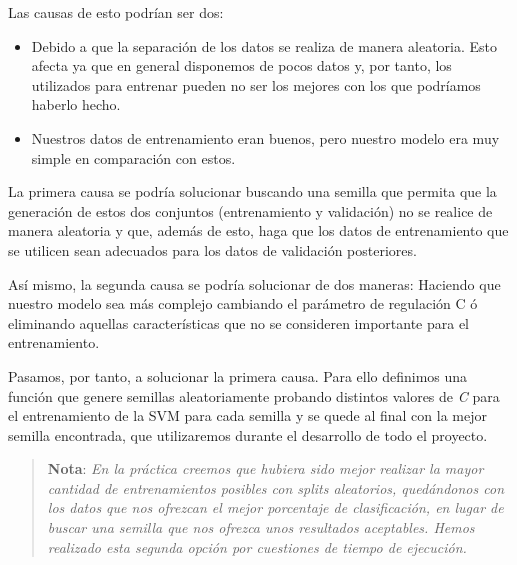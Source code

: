 \documentclass[11pt]{article}
\begin{document}
Las causas de esto podrían ser dos:

\begin{itemize}
\item
  Debido a que la separación de los datos se realiza de manera
  aleatoria. Esto afecta ya que en general disponemos de pocos datos y,
  por tanto, los utilizados para entrenar pueden no ser los mejores con
  los que podríamos haberlo hecho.
\item
  Nuestros datos de entrenamiento eran buenos, pero nuestro modelo era
  muy simple en comparación con estos.
\end{itemize}

La primera causa se podría solucionar buscando una semilla que permita
que la generación de estos dos conjuntos (entrenamiento y validación) no
se realice de manera aleatoria y que, además de esto, haga que los datos
de entrenamiento que se utilicen sean adecuados para los datos de
validación posteriores.

Así mismo, la segunda causa se podría solucionar de dos maneras:
Haciendo que nuestro modelo sea más complejo cambiando el parámetro de
regulación C ó eliminando aquellas características que no se consideren
importante para el entrenamiento.

Pasamos, por tanto, a solucionar la primera causa. Para ello definimos
una función que genere semillas aleatoriamente probando distintos
valores de \emph{C} para el entrenamiento de la SVM para cada semilla y
se quede al final con la mejor semilla encontrada, que utilizaremos
durante el desarrollo de todo el proyecto.

\begin{quote}
\textbf{Nota}: \emph{En la práctica creemos que hubiera sido mejor
realizar la mayor cantidad de entrenamientos posibles con splits
aleatorios, quedándonos con los datos que nos ofrezcan el mejor
porcentaje de clasificación, en lugar de buscar una semilla que nos
ofrezca unos resultados aceptables. Hemos realizado esta segunda opción
por cuestiones de tiempo de ejecución.}
\end{quote}
\end{document}
